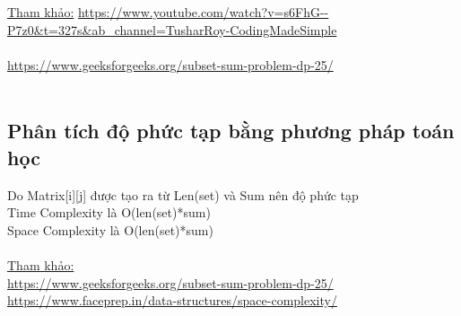 \documentclass{article}
\begin{document}
	\underline{Tham khảo:} \url{https://www.youtube.com/watch?v=s6FhG--P7z0&t=327s&ab_channel=TusharRoy-CodingMadeSimple}\\\\
	\url{https://www.geeksforgeeks.org/subset-sum-problem-dp-25/}\\\\
    \subsection{ \fontsize{16}{16}\selectfont\textbf{Phân tích độ phức tạp bằng phương pháp toán học}}
    Do Matrix[i][j] được tạo ra từ Len(set) và Sum nên độ phức tạp\\
    Time  Complexity là O(len(set)*sum)\\
    Space Complexity là O(len(set)*sum)\\\\
    \underline{Tham khảo:} \\
    \url{https://www.geeksforgeeks.org/subset-sum-problem-dp-25/}\\
    \url{https://www.faceprep.in/data-structures/space-complexity/}\\\\
    
    \newpage
\end{document}
